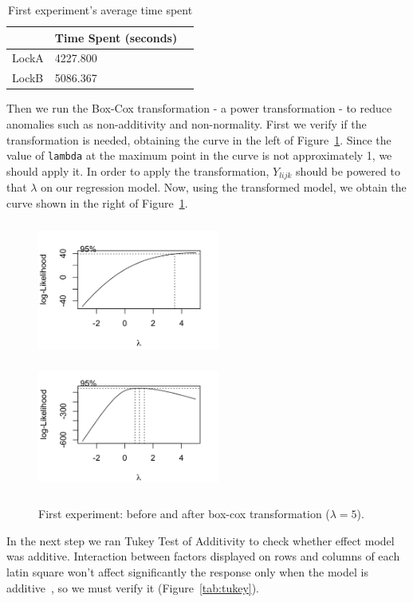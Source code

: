 \begin{table}
\centering
\begin{tabular}{|l|l|l|}
\hline
 & Time Spent (seconds)\\
\hline
LockA & 4227.800 \\
LockB & 5086.367 \\
\hline
\end{tabular}
\caption{First experiment's average time spent}\label{tab:mean1}
\end{table}

Then we run the Box-Cox transformation - a power transformation - to reduce anomalies such as non-additivity and non-normality.
First we verify if the transformation is needed, obtaining the curve in the left of Figure~\ref{fig:transf1}.
Since the value of {\tt lambda} at the maximum point in the curve is not approximately 1, we should apply it.
In order to apply the transformation, $Y_{lijk}$ should be powered to that $\lambda$ on our regression model.
Now, using the transformed model, we obtain the curve shown in the right of Figure~\ref{fig:transf1}.

\begin{figure}
\includegraphics[height=4.5cm, width=6cm]{img/u2.png}
\hfill
\includegraphics[height=4.3cm, width=6cm]{img/u2boxcox.png}
\caption{First experiment: before and after box-cox transformation ($\lambda = 5$).}\label{fig:transf1}
\end{figure}

In the next step we ran Tukey Test of Additivity to check whether effect model was additive.
Interaction between factors displayed on rows and columns of each latin square won't affect significantly the response only when the model is additive~\cite{box},
so we must verify it (Figure~\ref{tab:tukey}).

